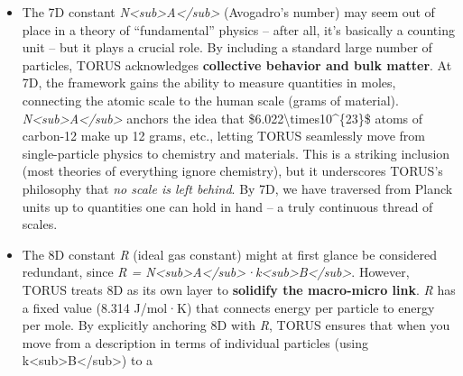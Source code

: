 \documentclass[
]{article}
\begin{document}
\begin{itemize}
  (Boltzmann's constant) is like a switch that turns on
  \textbf{thermodynamics}. It links microscopic energy (joules) to
  temperature (kelvins), essentially providing a bridge between the
  microscopic world of particles and the macroscopic notion of heat and
  temperature. Physically, introducing
  \emph{k\textless sub\textgreater B\textless/sub\textgreater{}} means
  that by this level, the recursion has accumulated enough degrees of
  freedom to talk about statistical ensembles and entropy. In TORUS, 6D
  marks where a single particle's energy (set by 5D \emph{h} and some
  frequency) can be interpreted as thermal energy
  *k\textless sub\textgreater B\textless/sub\textgreater T in an
  ensemble. Thus,
  \emph{k\textless sub\textgreater B\textless/sub\textgreater{}} anchors
  the concept of temperature in the unified framework.
\item
  The 7D constant
  \emph{N\textless sub\textgreater A\textless/sub\textgreater{}}
  (Avogadro's number) may seem out of place in a theory of
  ``fundamental'' physics -- after all, it's basically a counting unit
  -- but it plays a crucial role. By including a standard large number
  of particles, TORUS acknowledges \textbf{collective behavior and bulk
  matter}. At 7D, the framework gains the ability to measure quantities
  in moles, connecting the atomic scale to the human scale (grams of
  material).
  \emph{N\textless sub\textgreater A\textless/sub\textgreater{}} anchors
  the idea that \$6.022\textbackslash times10\^{}\{23\}\$ atoms of
  carbon-12 make up 12 grams, etc., letting TORUS seamlessly move from
  single-particle physics to chemistry and materials. This is a striking
  inclusion (most theories of everything ignore chemistry), but it
  underscores TORUS's philosophy that \emph{no scale is left behind}. By
  7D, we have traversed from Planck units up to quantities one can hold
  in hand -- a truly continuous thread of scales\hspace{0pt}.
\item
  The 8D constant \emph{R} (ideal gas constant) might at first glance be
  considered redundant, since \emph{R =
  N\textless sub\textgreater A\textless/sub\textgreater·k\textless sub\textgreater B\textless/sub\textgreater{}}.
  However, TORUS treats 8D as its own layer to \textbf{solidify the
  macro-micro link}. \emph{R} has a fixed value (8.314 J/mol·K) that
  connects energy per particle to energy per mole. By explicitly
  anchoring 8D with \emph{R}, TORUS ensures that when you move from a
  description in terms of individual particles (using
  k\textless sub\textgreater B\textless/sub\textgreater) to a

\end{itemize}
\end{document}
